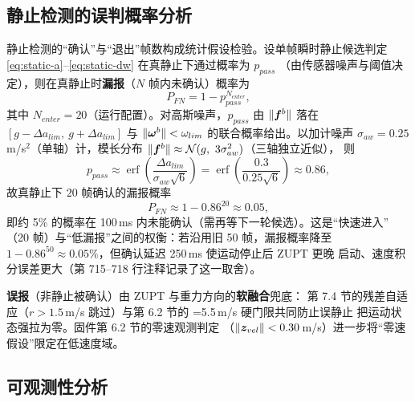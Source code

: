 \subsection{静止检测的误判概率分析}

静止检测的``确认''与``退出''帧数构成统计假设检验。设单帧瞬时静止候选判定
\cref{eq:static-a}--\cref{eq:static-dw} 在真静止下通过概率为 $p_{pass}$
（由传感器噪声与阈值决定），则在真静止时\textbf{漏报}（$N$ 帧内未确认）概率为
\begin{equation}
  P_{FN} = 1 - p_{pass}^{N_{enter}},
  \label{eq:static-fn}
\end{equation}
其中 $N_{enter} = 20$（运行配置）。对高斯噪声，$p_{pass}$ 由
$\|\boldsymbol{f}^b\|$ 落在 $[g-\Delta a_{lim},\ g+\Delta a_{lim}]$ 与
$\|\boldsymbol{\omega}^b\| < \omega_{lim}$ 的联合概率给出。以加计噪声
$\sigma_{aw} = 0.25$\,m/s$^2$（单轴）计，模长分布
$\|\vp{f}^b\| \approx \mathcal{N}(g,\ 3\sigma_{aw}^2)$（三轴独立近似），
则
\begin{equation}
  p_{pass} \approx \operatorname{erf}\left(\frac{\Delta a_{lim}}
    {\sigma_{aw}\sqrt{6}}\right)
  = \operatorname{erf}\left(\frac{0.3}{0.25\sqrt{6}}\right)
  \approx 0.86,
  \label{eq:static-pass-prob}
\end{equation}
故真静止下 $20$ 帧确认的漏报概率
\begin{equation}
  P_{FN} \approx 1 - 0.86^{20} \approx 0.05,
  \label{eq:static-fn-num}
\end{equation}
即约 5\% 的概率在 100\,ms 内未能确认（需再等下一轮候选）。这是``快速进入''
（20 帧）与``低漏报''之间的权衡：若沿用旧 50 帧，漏报概率降至
$1 - 0.86^{50} \approx 0.05\%$，但确认延迟 250\,ms 使运动停止后 ZUPT 更晚
启动、速度积分误差更大（第 715--718 行注释记录了这一取舍）。

\textbf{误报}（非静止被确认）由 ZUPT 与重力方向的\textbf{软融合}兜底：
第 7.4 节的残差自适应（$r>1.5$\,m/s 跳过）与第 6.2 节的
=5.5\,m/s 硬门限共同防止误静止
把运动状态强拉为零。固件第 6.2 节的零速观测判定
（$\|\boldsymbol{z}_{vel}\| < 0.30$\,m/s）进一步将``零速假设''限定在低速度域。

\subsection{可观测性分析}

